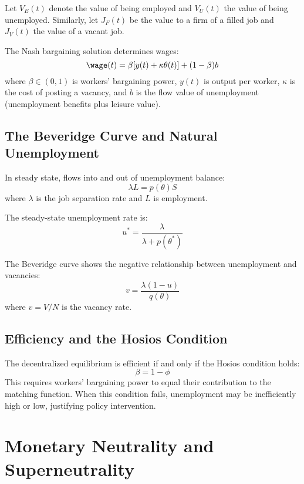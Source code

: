 \documentclass[\topdir/lecture\_notes.tex]{subfiles}
\begin{document}
Let $V_E(t)$ denote the value of being employed and $V_U(t)$ the value of being unemployed. Similarly, let $J_F(t)$ be the value to a firm of a filled job and $J_V(t)$ the value of a vacant job.

The Nash bargaining solution determines wages:
\begin{equation}
\wage(t) = \beta[y(t) + \kappa\theta(t)] + (1-\beta)b
\end{equation}
where $\beta \in (0,1)$ is workers' bargaining power, $y(t)$ is output per worker, $\kappa$ is the cost of posting a vacancy, and $b$ is the flow value of unemployment (unemployment benefits plus leisure value).

\subsection{The Beveridge Curve and Natural Unemployment}

In steady state, flows into and out of unemployment balance:
\begin{equation}
\lambda L = p(\theta)S
\end{equation}
where $\lambda$ is the job separation rate and $L$ is employment.

The steady-state unemployment rate is:
\begin{equation}
u^* = \frac{\lambda}{\lambda + p(\theta^*)}
\end{equation}

The Beveridge curve shows the negative relationship between unemployment and vacancies:
\begin{equation}
v = \frac{\lambda(1-u)}{q(\theta)}
\end{equation}
where $v = V/N$ is the vacancy rate.

\subsection{Efficiency and the Hosios Condition}

The decentralized equilibrium is efficient if and only if the Hosios condition holds:
\begin{equation}
\beta = 1 - \phi
\end{equation}
This requires workers' bargaining power to equal their contribution to the matching function. When this condition fails, unemployment may be inefficiently high or low, justifying policy intervention.

\section{Monetary Neutrality and Superneutrality}
\end{document}
